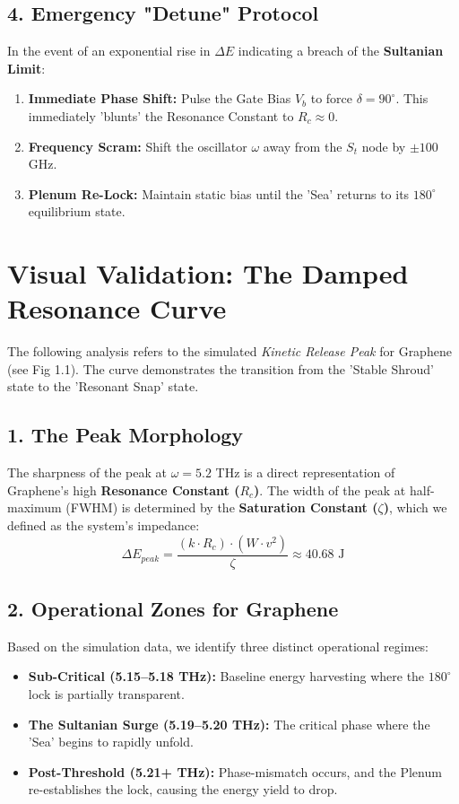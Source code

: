 \documentclass[11pt]{article}
\begin{document}
\subsection*{4. Emergency "Detune" Protocol}
In the event of an exponential rise in $\Delta E$ indicating a breach of the \textbf{Sultanian Limit}:
\begin{enumerate}
    \item \textbf{Immediate Phase Shift:} Pulse the Gate Bias $V_b$ to force $\delta = 90^\circ$. This immediately 'blunts' the Resonance Constant to $R_c \approx 0$.
    \item \textbf{Frequency Scram:} Shift the oscillator $\omega$ away from the $S_t$ node by $\pm 100$ GHz.
    \item \textbf{Plenum Re-Lock:} Maintain static bias until the 'Sea' returns to its $180^\circ$ equilibrium state.
\end{enumerate}

\section*{Visual Validation: The Damped Resonance Curve}

The following analysis refers to the simulated \textit{Kinetic Release Peak} for Graphene (see Fig 1.1). The curve demonstrates the transition from the 'Stable Shroud' state to the 'Resonant Snap' state.

\subsection*{1. The Peak Morphology}
The sharpness of the peak at $\omega = 5.2$ THz is a direct representation of Graphene's high \textbf{Resonance Constant ($R_c$)}. The width of the peak at half-maximum (FWHM) is determined by the \textbf{Saturation Constant ($\zeta$)}, which we defined as the system's impedance:
\begin{equation}
    \Delta E_{peak} = \frac{(k \cdot R_c) \cdot (W \cdot v^2)}{\zeta} \approx 40.68 \text{ J}
\end{equation}

\subsection*{2. Operational Zones for Graphene}
Based on the simulation data, we identify three distinct operational regimes:
\begin{itemize}
    \item \textbf{Sub-Critical (5.15--5.18 THz):} Baseline energy harvesting where the $180^\circ$ lock is partially transparent.
    \item \textbf{The Sultanian Surge (5.19--5.20 THz):} The critical phase where the 'Sea' begins to rapidly unfold.
    \item \textbf{Post-Threshold (5.21+ THz):} Phase-mismatch occurs, and the Plenum re-establishes the lock, causing the energy yield to drop.
\end{itemize}
\end{document}
